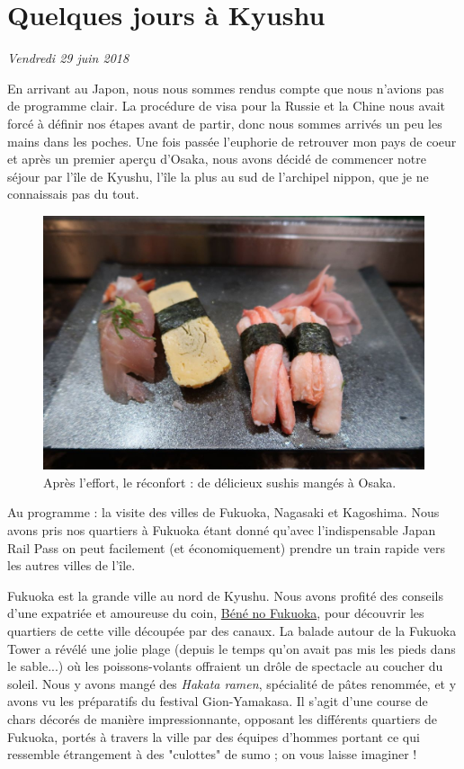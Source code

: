 \hypertarget{quelques-jours-uxe0-kyushu}{%
\section{Quelques jours à Kyushu}\label{quelques-jours-uxe0-kyushu}}

\emph{Vendredi 29 juin 2018}

En arrivant au Japon, nous nous sommes rendus compte que nous n'avions
pas de programme clair. La procédure de visa pour la Russie et la Chine
nous avait forcé à définir nos étapes avant de partir, donc nous sommes
arrivés un peu les mains dans les poches. Une fois passée l'euphorie de
retrouver mon pays de coeur et après un premier aperçu d'Osaka, nous
avons décidé de commencer notre séjour par l'île de Kyushu, l'île la
plus au sud de l'archipel nippon, que je ne connaissais pas du tout.

\begin{figure}
\centering
\includegraphics{images/20180709_sushi.JPG}
\caption{Après l'effort, le réconfort : de délicieux sushis mangés à
Osaka.}
\end{figure}

Au programme : la visite des villes de Fukuoka, Nagasaki et Kagoshima.
Nous avons pris nos quartiers à Fukuoka étant donné qu'avec
l'indispensable Japan Rail Pass on peut facilement (et économiquement)
prendre un train rapide vers les autres villes de l'île.

Fukuoka est la grande ville au nord de Kyushu. Nous avons profité des
conseils d'une expatriée et amoureuse du coin,
\href{http://www.benefukuoka.com/2015/12/fukuoka-conseils.html}{Béné no
Fukuoka}, pour découvrir les quartiers de cette ville découpée par des
canaux. La balade autour de la Fukuoka Tower a révélé une jolie plage
(depuis le temps qu'on avait pas mis les pieds dans le sable...) où les
poissons-volants offraient un drôle de spectacle au coucher du soleil.
Nous y avons mangé des \emph{Hakata ramen}, spécialité de pâtes
renommée, et y avons vu les préparatifs du festival Gion-Yamakasa. Il
s'agit d'une course de chars décorés de manière impressionnante,
opposant les différents quartiers de Fukuoka, portés à travers la ville
par des équipes d'hommes portant ce qui ressemble étrangement à des
"culottes" de sumo ; on vous laisse imaginer !


